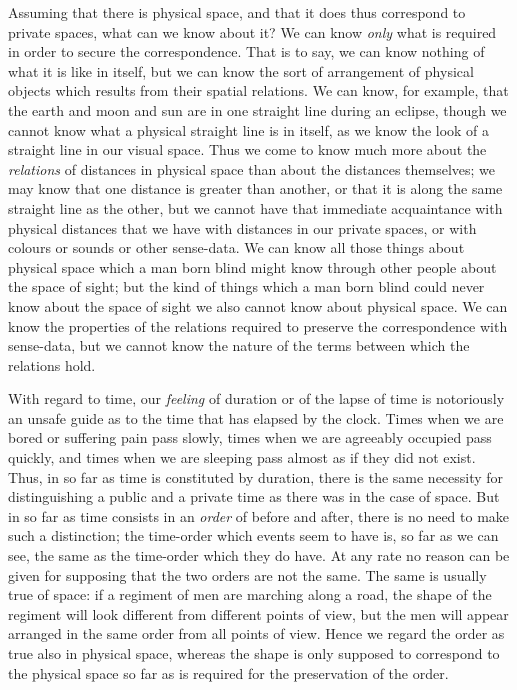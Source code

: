 \documentclass[oneside,letterpaper,12pt]{book}
\begin{document}
Assuming that there is physical space, and that it does thus correspond
to private spaces, what can we know about it? We can know \emph{only}
what is required in order to secure the correspondence. That is to say,
we can know nothing of what it is like in itself, but we can know the
sort of arrangement of physical objects which results from their spatial
relations. We can know, for example, that the earth and moon and sun are
in one straight line during an eclipse, though we cannot know what a
physical straight line is in itself, as we know the look of a straight
line in our visual space. Thus we come to know much more about the
\emph{relations} of distances in physical space than about the distances
themselves; we may know that one distance is greater than another, or
that it is along the same straight line as the other, but we cannot have
that immediate acquaintance with physical distances that we have with
distances in our private spaces, or with colours or sounds or other
sense-data. We can know all those things about physical space which a
man born blind might know through other people about the space of sight;
but the kind of things which a man born blind could never know about the
space of sight we also cannot know about physical space. We can know the
properties of the relations required to preserve the correspondence with
sense-data, but we cannot know the nature of the terms between which the
relations hold.

\label{timeorder} With regard to time, our \emph{feeling} of duration or of the lapse of
time is notoriously an unsafe guide as to the time that has elapsed by
the clock. Times when we are bored or suffering pain pass slowly, times
when we are agreeably occupied pass quickly, and times when we are
sleeping pass almost as if they did not exist. Thus, in so far as time
is constituted by duration, there is the same necessity for
distinguishing a public and a private time as there was in the case of
space. But in so far as time consists in an \emph{order} of before and
after, there is no need to make such a distinction; the time-order which
events seem to have is, so far as we can see, the same as the time-order
which they do have. At any rate no reason can be given for supposing
that the two orders are not the same. The same is usually true of space:
if a regiment of men are marching along a road, the shape of the
regiment will look different from different points of view, but the men
will appear arranged in the same order from all points of view. Hence we
regard the order as true also in physical space, whereas the shape is
only supposed to correspond to the physical space so far as is required
for the preservation of the order.
\end{document}
